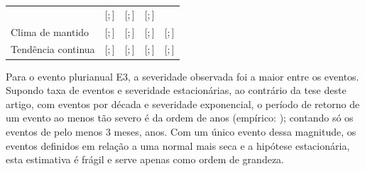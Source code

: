 \documentclass[11pt,a4paper]{article}
\newcommand{\IC}[2]{[#1;\,#2]}            %
\begin{document}
\begin{table}[htbp]
\begin{tabular}{@{}lcccc@{}}
                 & \ProbBayesNumzero{} \IC{\ProbBayesNumzeroICinf}{\ProbBayesNumzeroICsup}
                 & \ProbBayesNdoiszero{} \IC{\ProbBayesNdoiszeroICinf}{\ProbBayesNdoiszeroICsup}
                 & \ProbBayesNtreszero{} \IC{\ProbBayesNtreszeroICinf}{\ProbBayesNtreszeroICsup} \\
    Clima de \UltimoAnoNS{} mantido & \ProbNSUltNcinco{} \IC{\ProbNSUltNcincoICinf}{\ProbNSUltNcincoICsup}
                 & \ProbNSUltNumzero{} \IC{\ProbNSUltNumzeroICinf}{\ProbNSUltNumzeroICsup}
                 & \ProbNSUltNdoiszero{} \IC{\ProbNSUltNdoiszeroICinf}{\ProbNSUltNdoiszeroICsup}
                 & \ProbNSUltNtreszero{} \IC{\ProbNSUltNtreszeroICinf}{\ProbNSUltNtreszeroICsup} \\
    Tendência continua & \ProbNSContNcinco{} \IC{\ProbNSContNcincoICinf}{\ProbNSContNcincoICsup}
                 & \ProbNSContNumzero{} \IC{\ProbNSContNumzeroICinf}{\ProbNSContNumzeroICsup}
                 & \ProbNSContNdoiszero{} \IC{\ProbNSContNdoiszeroICinf}{\ProbNSContNdoiszeroICsup}
                 & \ProbNSContNtreszero{} \IC{\ProbNSContNtreszeroICinf}{\ProbNSContNtreszeroICsup} \\
    \bottomrule
  \end{tabular}
\end{table}

Para o evento plurianual E3, a severidade observada foi a maior entre os \NeventosSPI{} eventos.
Supondo taxa de eventos e severidade estacionárias, ao contrário da tese deste artigo, com
\TaxaEventos{} eventos por década e severidade exponencial, o período de retorno de um evento ao menos
tão severo é da ordem de \TSeveridadeRef{} anos (empírico: \TSeveridadeEmp{}); contando só os
\NeventosSPIMinTres{} eventos de pelo menos 3 meses, \TSeveridadeRefMinTres{} anos. Com um único evento
dessa magnitude, os eventos definidos em relação a uma normal mais seca e a hipótese estacionária, esta
estimativa é frágil e serve apenas como ordem de grandeza.
\end{document}
